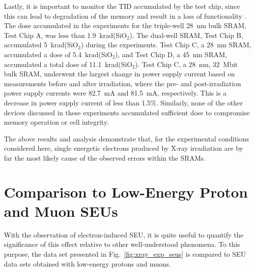 Lastly, it is important to monitor the TID accumulated by the test chip, since this can lead to degradation of the memory and result in a loss of functionality \cite{Fleetwood:1987cf}. 
The dose accumulated in the experiments for the triple-well 28~nm bulk SRAM, Test Chip A, was less than 1.9~krad(SiO$_2$). 
The dual-well SRAM, Test Chip B, accumulated 5~krad(SiO$_2$) during the experiments. 
Test Chip C, a 28~nm SRAM, accumulated a dose of 5.4~krad(SiO$_2$), and Test Chip D, a 45~nm SRAM, accumulated a total dose of 11.1~krad(SiO$_2$). 
Test Chip C, a 28~nm, 32~Mbit bulk SRAM, underwent the largest change in power supply current based on measurements before and after irradiation, where the pre- and post-irradiation power supply currents were 82.7~mA and 81.5~mA, respectively.
This is a decrease in power supply current of less than 1.5\%.
Similarly, none of the other devices discussed in these experiments accumulated sufficient dose to compromise memory operation or cell integrity.

The above results and analysis demonstrate that, for the experimental conditions considered here, single energetic electrons produced by X-ray irradiation are by far the most likely cause of the observed errors within the SRAMs.

\section{Comparison to Low-Energy Proton and Muon SEUs} %
\label{sec:comparison_to_low_energy_proton_and_muon_seus}
With the observation of electron-induced SEU, it is quite useful to quantify the significance of this effect relative to other well-understood phenomena. 
To this purpose, the data set presented in Fig.~\ref{fig:xray_exp_seus} is compared to SEU data sets obtained with low-energy protons and muons.

